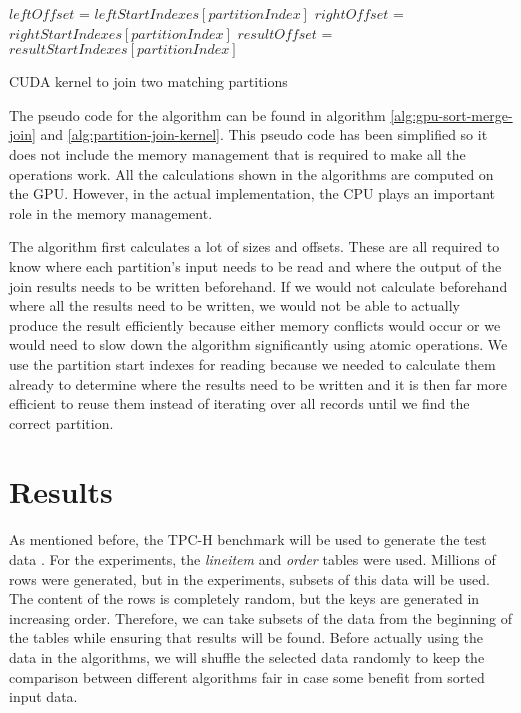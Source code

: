 \documentclass[a4paper,titlepage]{article}
\begin{document}
\begin{algorithm}
 \label{alg:partition-join-kernel}
 $leftOffset$ = $leftStartIndexes[partitionIndex]$ \;
 $rightOffset$ = $rightStartIndexes[partitionIndex]$ \;
 $resultOffset$ = $resultStartIndexes[partitionIndex]$ \;
 \;
 \caption{CUDA kernel to join two matching partitions}
\end{algorithm}

The pseudo code for the algorithm can be found in algorithm \ref{alg:gpu-sort-merge-join} and \ref{alg:partition-join-kernel}. This pseudo code has been simplified so it does not include the memory management that is required to make all the operations work. All the calculations shown in the algorithms are computed on the GPU. However, in the actual implementation, the CPU plays an important role in the memory management. 

The algorithm first calculates a lot of sizes and offsets. These are all required to know where each partition's input needs to be read and where the output of the join results needs to be written beforehand. If we would not calculate beforehand where all the results need to be written, we would not be able to actually produce the result efficiently because either memory conflicts would occur or we would need to slow down the algorithm significantly using atomic operations. We use the partition start indexes for reading because we needed to calculate them already to determine where the results need to be written and it is then far more efficient to reuse them instead of iterating over all records until we find the correct partition.

\section{Results}
\label{sec:results}
As mentioned before, the TPC-H benchmark will be used to generate the test data \cite{tpc-h}. For the experiments, the \emph{lineitem} and \emph{order} tables were used. Millions of rows were generated, but in the experiments, subsets of this data will be used. The content of the rows is completely random, but the keys are generated in increasing order. Therefore, we can take subsets of the data from the beginning of the tables while ensuring that results will be found. Before actually using the data in the algorithms, we will shuffle the selected data randomly to keep the comparison between different algorithms fair in case some benefit from sorted input data.
\end{document}
